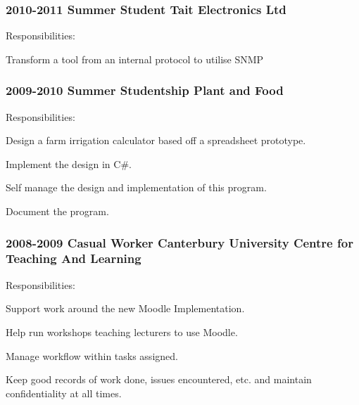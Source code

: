 \documentclass[10pt]{article}
\newenvironment{packed_items}{
    \begin{itemize}
    \setlength{\itemsep}{1pt}
    \setlength{\parskip}{0pt}
    \setlength{\parsep}{0pt}
}{\end{itemize}}
\begin{document}
        \subsubsection*{2010-2011 \quad Summer Student \quad Tait Electronics Ltd}\small
            Responsibilities:
            \begin{packed_items}
              \item{Transform a tool from an internal protocol to utilise SNMP}
            \end{packed_items}
        \subsubsection*{2009-2010 \quad Summer Studentship \quad Plant and Food}\small
            Responsibilities:
            \begin{packed_items}
                \item{Design a farm irrigation calculator based off a spreadsheet prototype.}
                \item{Implement the design in C\#.}
                \item{Self manage the design and implementation of this program.}
                \item{Document the program.}
            \end{packed_items}
        \subsubsection*{2008-2009 \quad Casual Worker \quad Canterbury University Centre for Teaching And Learning}\small
            Responsibilities:
            \begin{packed_items}
                \item{Support work around the new Moodle Implementation.}
                \item{Help run workshops teaching lecturers to use Moodle.}
                \item{Manage workflow within tasks assigned.}
                \item{Keep good records of work done, issues encountered, etc. and maintain confidentiality at all times.}
            \end{packed_items}
\end{document}
